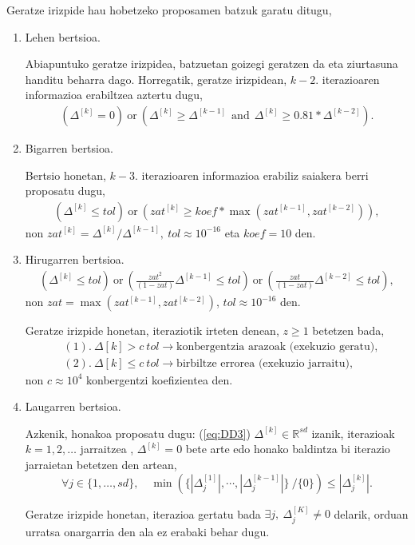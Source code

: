 Geratze irizpide hau hobetzeko proposamen batzuk garatu ditugu,
\begin{enumerate}
\item Lehen bertsioa.

Abiapuntuko geratze irizpidea, batzuetan goizegi geratzen da eta ziurtasuna handitu beharra dago.  Horregatik, geratze irizpidean, $k-2.$ iterazioaren informazioa erabiltzea aztertu dugu, 
\begin{align*}
(\Delta^{[k]} = 0) \ \text{or} \ ( \Delta^{[k]}\geqslant \Delta^{[k-1]} \ \ \text{and} \ \ \Delta^{[k]}\geqslant 0.81*\Delta^{[k-2]}).
\end{align*}

\item Bigarren bertsioa.

Bertsio honetan, $k-3.$ iterazioaren informazioa erabiliz saiakera berri proposatu dugu,
\begin{align*}
\left(\Delta^{[k]} \leqslant tol \right) \ \text{or} \ \left( zat^{[k]} \geqslant koef*\max(zat^{[k-1]},zat^{[k-2]}) \right),
\end{align*}
non $zat^{[k]}={\Delta^{[k]}}/{\Delta^{[k-1]}}, \ tol\approx10^{-16}$ eta $koef=10$ den.

\item Hirugarren bertsioa.
\begin{align*}
\left(\Delta^{[k]} \leqslant tol\right) \ \text{or} \ \left(\frac{zat^2}{(1-zat)} \Delta^{[k-1]} \leqslant tol\right) \ \text{or} \ \left(\frac{zat}{(1-zat)}\Delta^{[k-2]} \leqslant tol\right),
\end{align*}
non $zat=\max(zat^{[k-1]},zat^{[k-2]})$, $tol\approx10^{-16}$ den.

Geratze irizpide honetan, iteraziotik irteten denean, $z\geqslant1$ betetzen bada,
\begin{align*}
&(1). \ \Delta {[k]} > c \ tol \rightarrow \text{konbergentzia arazoak (exekuzio geratu)},\\
&(2). \ \Delta {[k]} \leqslant c \ tol \rightarrow \text{birbiltze errorea (exekuzio jarraitu)},
\end{align*}   
non $c\approx 10^{4}$ konbergentzi koefizientea den. 

\item Laugarren bertsioa.

Azkenik, honakoa proposatu dugu: (\ref{eq:DD3}) $\Delta ^{[k]} \in \mathbb{R}^{sd}$ izanik, iterazioak  $k=1,2,\ldots$ jarraitzea , $ \Delta^{[k]} =0$ bete arte edo honako baldintza bi iterazio jarraietan betetzen den artean,
\begin{equation*}
\forall j \in \{1,\ldots,s d\},  \quad
\min \left(\{|\Delta_j^{[1]}|,\cdots ,|\Delta_j^{[k-1]}|\} \ /\{0\} \right) \leqslant |\Delta_j^{[k]}|.
\end{equation*}

Geratze irizpide honetan, iterazioa gertatu bada $\exists j,  \ \Delta_{j}^{[K]} \neq 0$ delarik, orduan urratsa onargarria den ala ez erabaki behar dugu. 


\end{enumerate}

